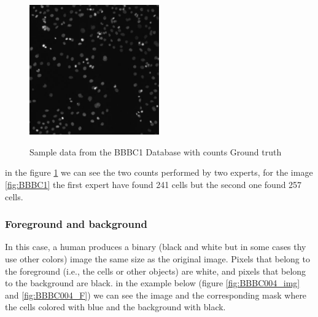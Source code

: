\begin{figure}[H]
\begin{minipage}[c]{\linewidth}
\centering
\includegraphics[width = 2.2in]{../images/AS_09125_050118150001_A03f05d0.jpg}
\label{fig:BBBC1}
\end{minipage}

\begin{minipage}[c]{\linewidth}
\centering

\label{fig:BBBC001_Counts}
\end{minipage}
\caption{Sample data from the BBBC1 Database with counts Ground truth}
\end{figure}

in the figure \ref{fig:BBBC001_Counts} we can see the two counts performed by two experts, for the image \ref{fig:BBBC1} the first expert have found 241 cells but the second one found 257 cells.

\subsubsection{Foreground and background}
\hspace{\parindent}
In this case, a human produces a binary (black and white but in some cases thy use other colors) image the same size as the original image. Pixels that belong to the foreground (i.e., the cells or other objects) are white, and pixels that belong to the background are black. in the example below (figure \ref{fig:BBBC004_img} and \ref{fig:BBBC004_F}) we can see the image and the corresponding mask where the cells colored with blue and the background with black.

